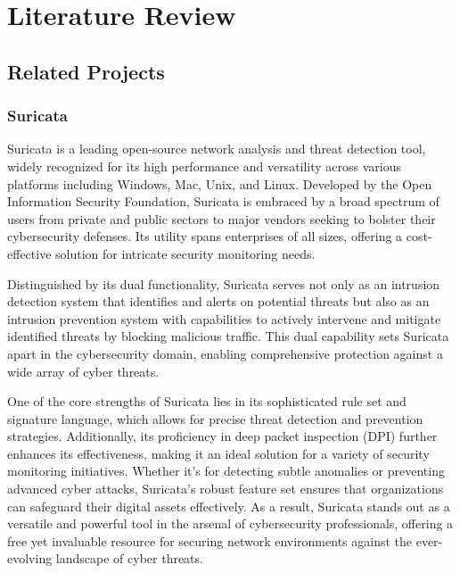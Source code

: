 \chapter{Literature Review}
\vspace{-18pt}
\section{Related Projects}
\vspace{-18pt}
\subsection{Suricata}
\vspace{-18pt}
Suricata is a leading open-source network analysis and threat detection tool, widely recognized for its high performance and versatility across various platforms including Windows, Mac, Unix, and Linux. Developed by the Open Information Security Foundation, Suricata is embraced by a broad spectrum of users from private and public sectors to major vendors seeking to bolster their cybersecurity defenses. Its utility spans enterprises of all sizes, offering a cost-effective solution for intricate security monitoring needs.\par 
Distinguished by its dual functionality, Suricata serves not only as an intrusion detection system that identifies and alerts on potential threats but also as an intrusion prevention system with capabilities to actively intervene and mitigate identified threats by blocking malicious traffic. This dual capability sets Suricata apart in the cybersecurity domain, enabling comprehensive protection against a wide array of cyber threats.\par 
One of the core strengths of Suricata lies in its sophisticated rule set and signature language, which allows for precise threat detection and prevention strategies. Additionally, its proficiency in deep packet inspection (DPI) further enhances its effectiveness, making it an ideal solution for a variety of security monitoring initiatives. Whether it's for detecting subtle anomalies or preventing advanced cyber attacks, Suricata's robust feature set ensures that organizations can safeguard their digital assets effectively. As a result, Suricata stands out as a versatile and powerful tool in the arsenal of cybersecurity professionals, offering a free yet invaluable resource for securing network environments against the ever-evolving landscape of cyber threats.
